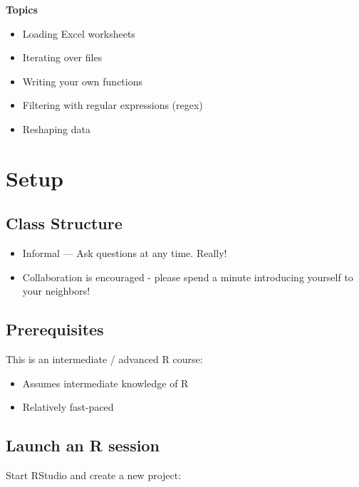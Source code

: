 \documentclass[]{book}
\providecommand{\tightlist}{%
  \setlength{\itemsep}{0pt}\setlength{\parskip}{0pt}}
\begin{document}
\textbf{Topics}

\begin{itemize}
\tightlist
\item
  Loading Excel worksheets
\item
  Iterating over files
\item
  Writing your own functions
\item
  Filtering with regular expressions (regex)
\item
  Reshaping data
\end{itemize}

\hypertarget{setup-3}{%
\section{Setup}\label{setup-3}}

\hypertarget{class-structure-3}{%
\subsection{Class Structure}\label{class-structure-3}}

\begin{itemize}
\tightlist
\item
  Informal --- Ask questions at any time. Really!
\item
  Collaboration is encouraged - please spend a minute introducing yourself to your neighbors!
\end{itemize}

\hypertarget{prerequisites-3}{%
\subsection{Prerequisites}\label{prerequisites-3}}

This is an intermediate / advanced R course:

\begin{itemize}
\tightlist
\item
  Assumes intermediate knowledge of R
\item
  Relatively fast-paced
\end{itemize}

\hypertarget{launch-an-r-session-4}{%
\subsection{Launch an R session}\label{launch-an-r-session-4}}

Start RStudio and create a new project:
\end{document}
